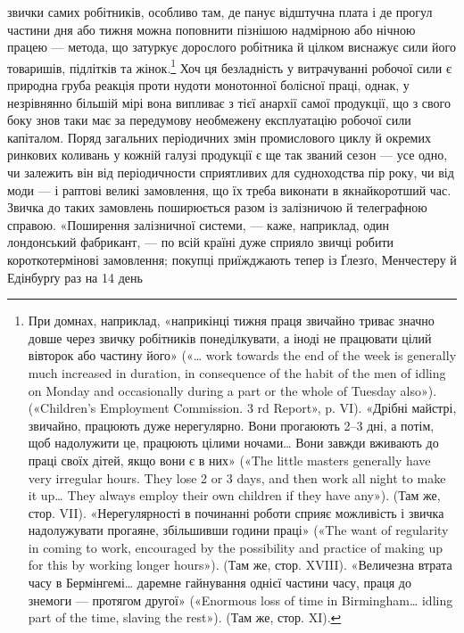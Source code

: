 \parcont{}  %
звички самих робітників, особливо там, де панує відштучна плата
і де прогул частини дня або тижня можна поповнити пізнішою
надмірною або нічною працею — метода, що затуркує дорослого
робітника й цілком виснажує сили його товаришів, підлітків та
жінок.\footnote{
При домнах, наприклад, «наприкінці тижня праця звичайно
триває значно довше через звичку робітників понеділкувати, а іноді не
працювати цілий вівторок або частину його» («\dots{} work towards the
end of the week is generally much increased in duration, in consequence
of the habit of the men of idling on Monday and occasionally during a part
or the whole of Tuesday also»). («Children’s Employment Commission.
3 rd Report», p. VI). «Дрібні майстрі, звичайно, працюють дуже нерегулярно.
Вони прогаюють 2--3 дні, а потім, щоб надолужити це, працюють
цілими ночами\dots{} Вони завжди вживають до праці своїх дітей, якщо вони
є в них» («The little masters generally have very irregular hours. They
lose 2 or 3 days, and then work all night to make it up\dots{} They always employ
their own children if they have any»). (Там же, стор. VII). «Нерегулярності
в починанні роботи сприяє можливість і звичка надолужувати прогаяне,
збільшивши години праці» («The want of regularity in coming to work,
encouraged by the possibility and practice of making up for this by working
longer hours»). (Там же, стор. XVIII). «Величезна втрата часу в Бермінгемі\dots{} даремне гайнування
однієї частини часу, праця до знемоги — протягом другої» («Enormous loss of time in Birmingham\dots{}
idling part of
the time, slaving the rest»). (Там же, стор. XI).
} Хоч ця безладність у витрачуванні робочої сили є
природна груба реакція проти нудоти монотонної болісної
праці, однак, у незрівнянно більшій мірі вона випливає з тієї
анархії самої продукції, що з свого боку знов таки має за передумову необмежену експлуатацію робочої
сили капіталом. Поряд
загальних періодичних змін промислового циклу й окремих ринкових коливань у кожній галузі продукції
є ще так званий сезон — усе одно, чи залежить він від періодичности сприятливих
для судноходства пір року, чи від моди — і раптові великі замовлення, що їх треба виконати в
якнайкоротший час. Звичка до
таких замовлень поширюється разом із залізничою й телеграфною справою. «Поширення залізничної
системи, — каже, наприклад, один лондонський фабрикант, — по всій країні дуже сприяло
звичці робити короткотермінові замовлення; покупці приїжджають тепер із Ґлезґо, Менчестеру й
Едінбурґу раз на 14 день
